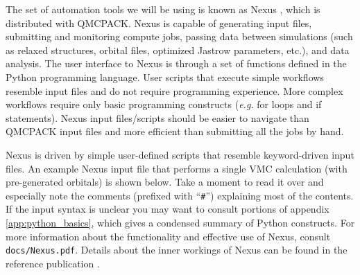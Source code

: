 The set of automation tools we will be using is known as Nexus \cite{Krogel2016nexus}, which is distributed with QMCPACK.  Nexus is capable of generating input files, submitting and monitoring compute jobs, passing data between simulations (such as relaxed structures, orbital files, optimized Jastrow parameters, etc.), and data analysis.  The user interface to Nexus is through a set of functions defined in the Python programming language.  User scripts that execute simple workflows resemble input files and do not require programming experience.  More complex workflows require only basic programming constructs (\emph{e.g.} for loops and if statements).  Nexus input files/scripts should be easier to navigate than QMCPACK input files and more efficient than submitting all the jobs by hand.

Nexus is driven by simple user-defined scripts that resemble keyword-driven input files.  An example Nexus input file that performs a single VMC calculation (with pre-generated orbitals) is shown below.  Take a moment to read it over and especially note the comments (prefixed with ``\texttt{\#}'') explaining most of the contents.  If the input syntax is unclear you may want to consult portions of appendix \ref{app:python_basics}, which gives a condensed summary of Python constructs.  For more information about the functionality and effective use of Nexus, consult \texttt{docs/Nexus.pdf}.  Details about the inner workings of Nexus can be found in the reference publication \cite{Krogel2016nexus}. 


